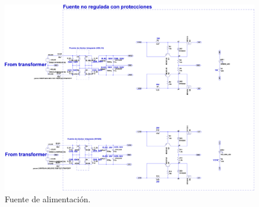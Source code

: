 \vfill

\clearpage


\begin{figure}[H]
	\centering
	\includegraphics[width=0.7\paperheight, angle=90]{img/power_supply.png}
	\caption{Fuente de alimentación.}
	\label{fig:power_supply}
\end{figure}